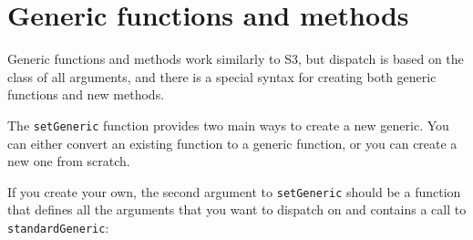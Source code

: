 \begin{Shaded}
\begin{Highlighting}[]
\StringTok{ }\NormalTok{(}\NormalTok{, } \NormalTok{, } \NormalTok{)}
\StringTok{ }\OperatorTok{:}
    
\end{Highlighting}
\end{Shaded}

\hypertarget{generic-functions-and-methods}{%
\section{Generic functions and
methods}\label{generic-functions-and-methods}}

Generic functions and methods work similarly to S3, but dispatch is
based on the class of all arguments, and there is a special syntax for
creating both generic functions and new methods.

The \texttt{setGeneric} function provides two main ways to create a new
generic. You can either convert an existing function to a generic
function, or you can create a new one from scratch.

\begin{Shaded}
\begin{Highlighting}[]
\StringTok{ }
\NormalTok{(}\NormalTok{)}
\end{Highlighting}
\end{Shaded}

If you create your own, the second argument to \texttt{setGeneric}
should be a function that defines all the arguments that you want to
dispatch on and contains a call to \texttt{standardGeneric}:

\begin{Shaded}
\begin{Highlighting}[]
\NormalTok{(}\NormalTok{, }
  \NormalTok{(}\NormalTok{)}
\NormalTok{\})}
\end{Highlighting}
\end{Shaded}

